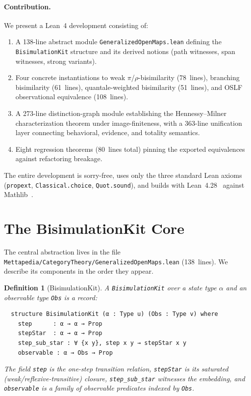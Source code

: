 \documentclass[11pt]{article}
\newtheorem{definition}[theorem]{Definition}
\begin{document}
\paragraph{Contribution.}
We present a Lean~4 development consisting of:
\begin{enumerate}
\item A 138-line abstract module \texttt{GeneralizedOpenMaps.lean}
  defining the \texttt{BisimulationKit} structure and its derived
  notions (path witnesses, span witnesses, strong variants).
\item Four concrete instantiations to weak $\pi$/$\rho$-bisimilarity
  (78~lines), branching bisimilarity (61~lines), quantale-weighted
  bisimilarity (51~lines), and OSLF observational equivalence
  (108~lines).
\item A 273-line distinction-graph module establishing the
  Hennessy--Milner characterization theorem under image-finiteness,
  with a 363-line unification layer connecting behavioral, evidence, and
  totality semantics.
\item Eight regression theorems (80~lines total) pinning the exported
  equivalences against refactoring breakage.
\end{enumerate}
The entire development is sorry-free, uses only the three standard Lean
axioms (\texttt{propext}, \texttt{Classical.choice}, \texttt{Quot.sound}),
and builds with Lean~4.28~\cite{Moura2021} against Mathlib~\cite{mathlib2020}.


\section{The BisimulationKit Core}\label{sec:core}

The central abstraction lives in the file
\texttt{Mettapedia/CategoryTheory/GeneralizedOpenMaps.lean} (138~lines).
We describe its components in the order they appear.

\begin{definition}[BisimulationKit]\label{def:kit}
A \texttt{BisimulationKit} over a state type $\alpha$ and an observable
type \texttt{Obs} is a record:
\begin{verbatim}
  structure BisimulationKit (α : Type u) (Obs : Type v) where
    step      : α → α → Prop
    stepStar  : α → α → Prop
    step_sub_star : ∀ {x y}, step x y → stepStar x y
    observable : α → Obs → Prop
\end{verbatim}
The field \texttt{step} is the one-step transition relation,
\texttt{stepStar} is its saturated (weak/reflexive-transitive) closure,
\texttt{step\_sub\_star} witnesses the embedding, and
\texttt{observable} is a family of observable predicates indexed by
\texttt{Obs}.
\end{definition}
\end{document}
